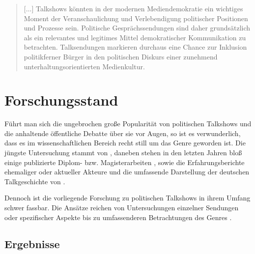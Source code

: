 \begin{quote}
	[$\ldots$] Talkshows könnten in der modernen Mediendemokratie ein wichtiges Moment der Veranschaulichung und Verlebendigung politischer Positionen und Prozesse sein. Politische Gesprächssendungen sind daher grundsätzlich als ein relevantes und legitimes Mittel demokratischer Kommunikation zu betrachten. Talksendungen markieren durchaus eine Chance zur Inklusion politikferner Bürger in den politischen Diskurs einer zunehmend unterhaltungsorientierten Medienkultur.
\end{quote}

\section{Forschungsstand}

Führt man sich die ungebrochen große Popularität von politischen Talkshows und die anhaltende öffentliche Debatte über sie vor Augen, so ist es verwunderlich, dass es im wissenschaftlichen Bereich recht still um das Genre geworden ist. Die jüngste Untersuchung stammt von \textcite{gaeblerUndUnserenTaeglichen2011}, daneben stehen in den letzten Jahren bloß einige publizierte Diplom- bzw. Magisterarbeiten \parencite{amelnQualitaetPolitischerTalkshows2010, koenningAllesBlossGeschwaetz2009, bockPolitainmentImDeutschen2009, schmidtQualitaetPolitischerTalkshows2007, eisentrautPolitTalkAlsForm2007}, sowie die Erfahrungsberichte ehemaliger oder aktueller Akteure \parencite{michelPolitTalkshowsBuehnenMacht2009} und die umfassende Darstellung der deutschen Talkgeschichte von \textcite{kellerGeschichteTalkshowDeutschland2009}.

Dennoch ist die vorliegende Forschung zu politischen Talkshows in ihrem Umfang schwer fassbar. Die Ansätze reichen von Untersuchungen einzelner Sendungen \parencite{muellerSchaubuehneFuerEinflussreichen2006, rossumMeineSonntageMit2004, tenscherSabineChristiansenUnd1999, nielandTalkshowisierungWahlkampfesAnalyse2002} oder spezifischer Aspekte \textcite{schultzModerationPolitischerGesprachsrunden2004, schultzJournalistenTalkPolitischeKommunikation2002, doernerPolitainmentPolitikMedialen2001, schrottElefantenUnterSich1996} bis zu umfassenderen Betrachtungen des Genres  \textcite{kellerGeschichteTalkshowDeutschland2009, plakeTalkshowsIndustrialisierungKommunikation1999, hollyPolitischeFernsehdiskussionenZur1986, mahloZurDiskussionUm1956, gaeblerUndUnserenTaeglichen2011, barloewenTalkShow1975}.

\subsection{Ergebnisse}

